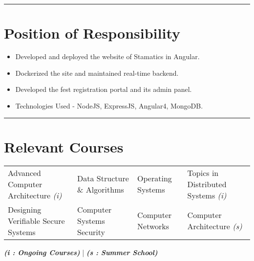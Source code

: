 \documentclass[10pt, margin=0.5in]{deedy-resume-openfont}
\begin{document}
\begin{minipage}[t]{0.48\textwidth}
\vspace{2pt}				%
\rule{\textwidth}{0.5pt}	%
\vspace{-16pt}				%

\section{Position of Responsibility}
\begin{itemize}[leftmargin=*, noitemsep]
  \item Developed and deployed the website of Stamatics in Angular.
  \item Dockerized the site and maintained real-time backend.	
\end{itemize}	
\begin{itemize}[leftmargin=*, noitemsep]
  \item Developed the fest registration portal and its admin panel.
  \item Technologies Used - NodeJS, ExpressJS, Angular4, MongoDB.	
\end{itemize}

\end{minipage}

\vspace{2pt}				%
\rule{\textwidth}{0.5pt}	%
\vspace{-18pt}				%

\section{\hspace{0.5cm}Relevant Courses}
\hspace{-6pt} \begin{tabular*}{\textwidth}{llll}
Advanced Computer Architecture \textit{(i)} & Data Structure \& Algorithms & Operating Systems & Topics in Distributed Systems \textit{(i)} \\
Designing Verifiable Secure Systems & Computer Systems Security & Computer Networks & Computer Architecture \textit{(s)}
\end{tabular*}


\hspace{-2pt} {\footnotesize \textit{\textbf{ (i : Ongoing Courses)}} | \textit{\textbf{ (s : Summer School)}}}
\end{document}
